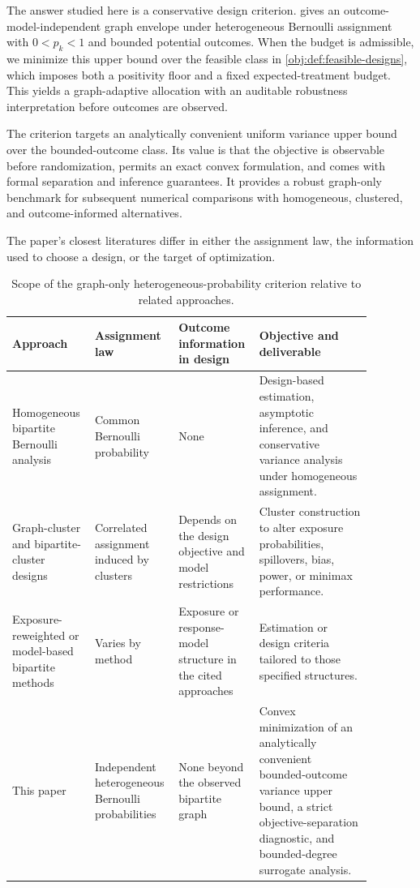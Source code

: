 The answer studied here is a conservative design criterion.  gives an outcome-model-independent graph envelope under heterogeneous Bernoulli assignment with \(0<p_k<1\) and bounded potential outcomes. When the budget is admissible, we minimize this upper bound over the feasible class in \cref{obj:def:feasible-designs}, which imposes both a positivity floor and a fixed expected-treatment budget. This yields a graph-adaptive allocation with an auditable robustness interpretation before outcomes are observed.

The criterion targets an analytically convenient uniform variance upper bound over the bounded-outcome class. Its value is that the objective is observable before randomization, permits an exact convex formulation, and comes with formal separation and inference guarantees. It provides a robust graph-only benchmark for subsequent numerical comparisons with homogeneous, clustered, and outcome-informed alternatives.

The paper's closest literatures differ in either the assignment law, the information used to choose a design, or the target of optimization.

\begin{table}[t]
\centering
\small
\begin{tabular}{p{0.22\linewidth}p{0.18\linewidth}p{0.18\linewidth}p{0.30\linewidth}}
\hline
Approach & Assignment law & Outcome information in design & Objective and deliverable \\
\hline
Homogeneous bipartite Bernoulli analysis \citep{LuShiFangZhangDing2025BipartiteDesign}
& Common Bernoulli probability
& None
& Design-based estimation, asymptotic inference, and conservative variance analysis under homogeneous assignment. \\
Graph-cluster and bipartite-cluster designs \citep{UganderYin2020RandomizedGCR,BrennanMirrokniPougetAbadie2022ClusterBipartite}
& Correlated assignment induced by clusters
& Depends on the design objective and model restrictions
& Cluster construction to alter exposure probabilities, spillovers, bias, power, or minimax performance. \\
Exposure-reweighted or model-based bipartite methods \citep{HarshawSavjeEisenstatMirrokniPougetAbadie2021BipartiteERL,DoudchenkoEtAl2020BipartiteDesign}
& Varies by method
& Exposure or response-model structure in the cited approaches
& Estimation or design criteria tailored to those specified structures. \\
This paper
& Independent heterogeneous Bernoulli probabilities
& None beyond the observed bipartite graph
& Convex minimization of an analytically convenient bounded-outcome variance upper bound, a strict objective-separation diagnostic, and bounded-degree surrogate analysis. \\
\hline
\end{tabular}
\caption{Scope of the graph-only heterogeneous-probability criterion relative to related approaches.}
\end{table}

